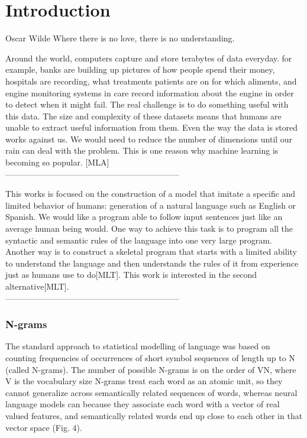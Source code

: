 \chapter{Introduction}
\label{ch:intro}

\begin{chapterquote}{Oscar Wilde}
	Where there is no love, there is no understanding.
\end{chapterquote}
Around the world, computers capture and store terabytes of data everyday. for example, banks are building up pictures of how people spend their money, hospitals are recording, what treatments patients are on for which aliments, and engine monitoring systems in care record information about the engine in order to detect when it might fail. The real challenge is to do something useful with this data. 
The size and complexity of these datasets means that humans are unable to extract useful information from them. Even the way the data is stored works against us. We would need to reduce the number of dimensions until our rain can deal with the problem. 
This is one reason why machine learning is becoming so popular.
[MLA]\\
---------------------------------------------------------------


This works is focused on the construction of a model that imitate a specific and limited behavior of humans: generation of a natural language such as English or Spanish. We would like a program able to follow input sentences just like an average human being would. One way to achieve this task is to program all the syntactic and semantic rules of the language into one very large program. Another way is to construct a skeletal program that starts with a limited ability to understand the language and then understands the rules of it from experience just as humans use to do[MLT]. This work is interested in the second alternative[MLT].\\
---------------------------------------------------------------


\subsection{N-grams}
The standard approach to statistical modelling of language was based on counting frequencies of occurrences of short symbol sequences of length up to N (called N-grams). The number of possible N-grams is on the order of VN, where V is the vocabulary size N-grams treat each word as an atomic unit, so they cannot generalize across semantically related sequences of words, whereas neural language models can because they associate each word with a vector of real valued features, and semantically related words end up close to each other in that vector space (Fig. 4).\cite{lecun2015deep}


